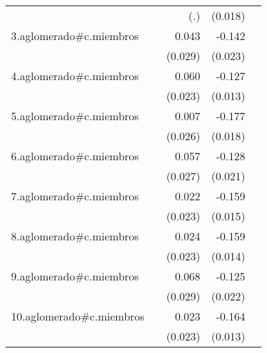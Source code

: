 {\begin{longtable}{l*{4}{D{.}{.}{-1}}}
            &                     &         (.)         &     (0.018)         &                     \\
\addlinespace
3.aglomerado#c.miembros&                     &       0.043         &      -0.142\sym{***}&                     \\
            &                     &     (0.029)         &     (0.023)         &                     \\
\addlinespace
4.aglomerado#c.miembros&                     &       0.060\sym{**} &      -0.127\sym{***}&                     \\
            &                     &     (0.023)         &     (0.013)         &                     \\
\addlinespace
5.aglomerado#c.miembros&                     &       0.007         &      -0.177\sym{***}&                     \\
            &                     &     (0.026)         &     (0.018)         &                     \\
\addlinespace
6.aglomerado#c.miembros&                     &       0.057\sym{*}  &      -0.128\sym{***}&                     \\
            &                     &     (0.027)         &     (0.021)         &                     \\
\addlinespace
7.aglomerado#c.miembros&                     &       0.022         &      -0.159\sym{***}&                     \\
            &                     &     (0.023)         &     (0.015)         &                     \\
\addlinespace
8.aglomerado#c.miembros&                     &       0.024         &      -0.159\sym{***}&                     \\
            &                     &     (0.023)         &     (0.014)         &                     \\
\addlinespace
9.aglomerado#c.miembros&                     &       0.068\sym{*}  &      -0.125\sym{***}&                     \\
            &                     &     (0.029)         &     (0.022)         &                     \\
\addlinespace
10.aglomerado#c.miembros&                     &       0.023         &      -0.164\sym{***}&                     \\
            &                     &     (0.023)         &     (0.013)         &                     \\

\end{longtable}}
